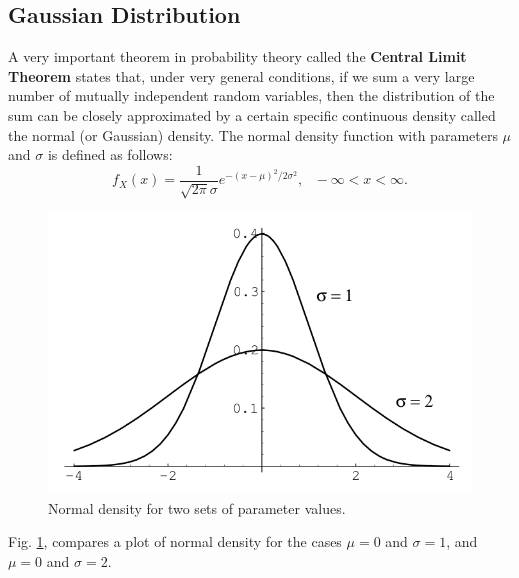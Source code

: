 
\subsection{\label{gaussian} Gaussian Distribution}
A very important theorem in probability theory called the {\bf Central Limit Theorem}
states that, under very general conditions, if we sum a very large number of mutually independent
random variables, then the distribution of the sum can be closely approximated by a certain specific
continuous density called the normal (or Gaussian) density. The normal density function with parameters
$\mu$ and $\sigma$ is defined as follows:
\begin{equation*}
f_{X}(x)=\frac{1}{\sqrt{2\pi}\sigma}e^{-(x-\mu)^2/2\sigma^2}, \text{   }-\infty < x < \infty.
\end{equation*}


\begin{figure}[h]
\begin{center}
    \includegraphics[width=0.6\columnwidth]{figs/intro/normal.png}
  \caption{\label{fig:normaldist} Normal density for two sets of parameter values.}
\end{center}
\end{figure}

Fig. \ref{fig:normaldist}, compares a plot of normal density for the cases $\mu=0$ and $\sigma=1$, and 
$\mu=0$ and  $\sigma=2$.

